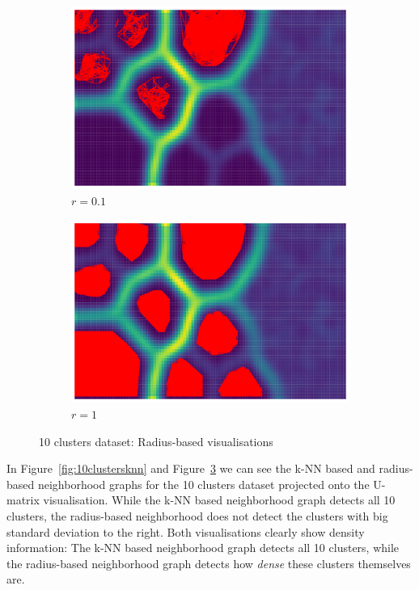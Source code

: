 \documentclass[12pt]{article}
\begin{document}
\begin{figure}[t]
    \centering
    \begin{subfigure}{.5\textwidth}
        \centering
        \includegraphics[width=.9\linewidth]{vis/10clusters_r_01.png}
        \caption{$r=0.1$}
        \label{fig:chainlinkr0.1}
    \end{subfigure}%
    \begin{subfigure}{.5\textwidth}
        \centering
        \includegraphics[width=.9\linewidth]{vis/10clusters_r_1.png}
        \caption{$r=1$}
        \label{fig:chainlinkr1}
    \end{subfigure}
    \caption{10 clusters dataset: Radius-based visualisations}
    \label{fig:10clustersradius}
\end{figure}
In Figure~\ref{fig:10clustersknn} and Figure~\ref{fig:10clustersradius} we can see the k-NN based and radius-based neighborhood graphs for the 10 clusters dataset projected onto the U-matrix visualisation.
While the k-NN based neighborhood graph detects all 10 clusters, the radius-based neighborhood does not detect the clusters with big standard deviation to the right.
Both visualisations clearly show density information:
The k-NN based neighborhood graph detects all 10 clusters, while the radius-based neighborhood graph detects how \textit{dense} these clusters themselves are.
\end{document}
